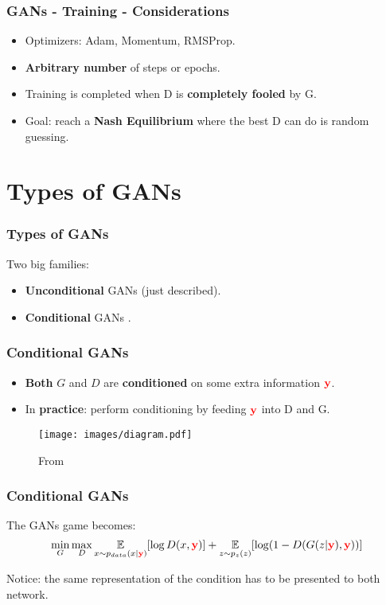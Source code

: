 \documentclass{beamer}
\begin{document}
\begin{frame}
	\frametitle{GANs - Training - Considerations}
	\begin{itemize}
		\item Optimizers: Adam, Momentum, RMSProp.
		\item \textbf{Arbitrary number} of steps or epochs.
		\item Training is completed when D is \textbf{completely fooled} by G.
		\item Goal: reach a \textbf{Nash Equilibrium} where the best D can do is random guessing.
	\end{itemize}
 \end{frame}
 
\section{Types of GANs}

\begin{frame}
	\frametitle{Types of GANs}
	Two big families:
	\begin{itemize}
		\item \textbf{Unconditional} GANs (just described).
		\item \textbf{Conditional} GANs \citep{mirzaConditionalGenerativeAdversarial2014}.
	\end{itemize}
\end{frame}

\begin{frame}
	\frametitle{Conditional GANs}
	\begin{itemize}
		\item \textbf{Both} $G$ and $D$ are \textbf{conditioned} on some extra information $ \color{red} \mathbf{y}$.
		\item In \textbf{practice}:  perform conditioning by feeding $\color{red} \mathbf{y}$ into D and G.
	\end{itemize}
	\vspace{-1cm}
	\begin{figure}
		\texttt{[image: images/diagram.pdf]}
		\vspace{-1cm}
		\caption{From \cite{mirzaConditionalGenerativeAdversarial2014}}
	\end{figure}
\end{frame}

\begin{frame}
	\frametitle{Conditional GANs}
	The GANs game becomes:
	$$ 
	\min_G \max_D \underset{x \sim p_{data}(x| \textcolor{red}{\mathbf{y}})}{\mathbb{E}} [\log D(x, \textcolor{red}{\mathbf{y}})]  +\underset{z \sim p_z(z)}{\mathbb{E}}[\log(1 - D(G(z|\textcolor{red}{\mathbf{y}}),\textcolor{red}{\mathbf{y}}))]
	$$

	\begin{block}{}
		Notice: the same representation of the condition has to be presented to both network.
	\end{block}
\end{frame}
\end{document}
